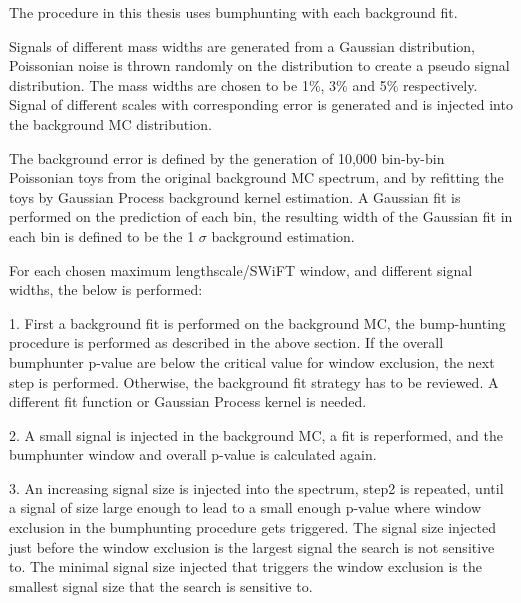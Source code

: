     The procedure in this thesis uses bumphunting with each background fit.

    Signals of different mass widths are generated from a Gaussian distribution, Poissonian noise is thrown randomly on the distribution to create a pseudo signal distribution. The mass widths are chosen to be 1\%, 3\% and 5\% respectively. Signal of different scales with corresponding error is generated and is injected into the background MC distribution.

    The background error is defined by the generation of 10,000 bin-by-bin Poissonian toys from the original background MC spectrum, and by refitting the toys by Gaussian Process background kernel estimation. A Gaussian fit is performed on the prediction of each bin, the resulting width of the Gaussian fit in each bin is defined to be the 1 $\sigma$ background estimation. 

   For each chosen maximum lengthscale/SWiFT window, and different signal widths, the below is performed:

   1. First a background fit is performed on the background MC, the bump-hunting~\cite{choudalakis2011hypothesis} procedure is performed as described in the above section. If the overall bumphunter p-value are below the critical value for window exclusion, the next step is performed. Otherwise, the background fit strategy has to be reviewed. A different fit function or Gaussian Process kernel is needed.

   2. A small signal is injected in the background MC, a fit is reperformed, and the bumphunter window and overall p-value is calculated again. 

   3. An increasing signal size is injected into the spectrum, step2 is repeated, until a signal of size large enough to lead to a small enough p-value where window exclusion in the bumphunting procedure gets triggered. The signal size injected just before the window exclusion is the largest signal the search is not sensitive to. The minimal signal size injected that triggers the window exclusion is the smallest signal size that the search is sensitive to. 

%

